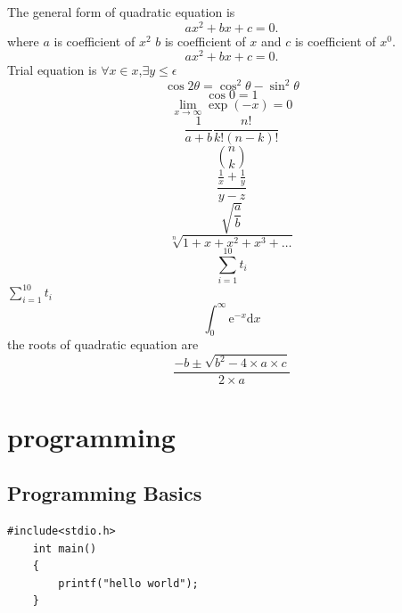 \documentclass[a4paper,15pt]{report}
\begin{document}
The general form of quadratic equation is 
\begin{displaymath}
	ax^{2}+bx+c=0.
\end{displaymath}
where $a$ is coefficient of $x^2$ $b$ is coefficient of $x$ and $c$ is coefficient of $x^0$.
\begin{equation}
	ax^{2}+bx+c=0.
\end{equation}
Trial equation is $\forall x \in  x$,$\exists y \leq \epsilon $
\begin{equation}
	\cos2\theta=\cos^{2}\theta-\sin^{2}\theta
\end{equation}
\begin{equation}
	\cos0=1
\end{equation}
\begin{equation}
	\lim_{x\to\infty}\exp(-x)=0
\end{equation}
\begin{equation}
	\frac{1}{a+b}
	\frac{n!}{k!(n-k)!}
\end{equation}
\begin{equation}
	\binom{n}{k}
\end{equation}
\begin{equation}
	\frac{\frac{1}{x}+\frac{1}{y}}{y-z}
\end{equation}
\begin{equation}
	\sqrt{\frac{a}{b}}
\end{equation}
\begin{equation}
	\sqrt[n]{1+x+x^2+x^3+\ldots}
\end{equation}
\begin{equation}
	\sum_{i=1}^{10}t_i
\end{equation}
$\sum_{i=1}^{10}t_i$
\begin{equation}
	\int_0^\infty\mathrm{e}^{-x}\mathrm{d}x
\end{equation}
the roots of quadratic equation are 
\begin{equation}
	\frac{-b\pm\sqrt{b^2-4\times a\times c}}{2\times a}
\end{equation}
\chapter{programming}
\section{Programming Basics}
\begin{lstlisting}[caption=hello world program]
	#include<stdio.h>
	int main()
	{
		printf("hello world");
	}
\end{lstlisting}	
\end{document}
